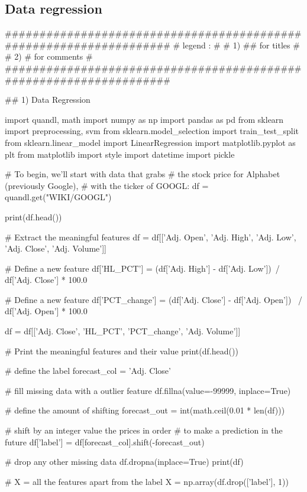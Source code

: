 \documentclass[11pt]{article}
\begin{document}
\subsection{Data regression}
\begin{python}
###################################################################
# legend :                                                        #
#         1) ## for titles                                        #
#         2) #  for comments                                      #
###################################################################

## 1) Data Regression

import quandl, math
import numpy as np
import pandas as pd
from sklearn import preprocessing, svm
from sklearn.model_selection import train_test_split
from sklearn.linear_model import LinearRegression
import matplotlib.pyplot as plt
from matplotlib import style
import datetime
import pickle

# To begin, we'll start with data that grabs
# the stock price for Alphabet (previously Google),
# with the ticker of GOOGL:
df = quandl.get("WIKI/GOOGL")

print(df.head())

# Extract the meaningful features
df = df[['Adj. Open',  'Adj. High',
         'Adj. Low',  'Adj. Close', 'Adj. Volume']]

# Define a new feature
df['HL_PCT'] = (df['Adj. High'] - df['Adj. Low'])\
               / df['Adj. Close'] * 100.0

# Define a new feature
df['PCT_change'] = (df['Adj. Close'] - df['Adj. Open']) \
                   / df['Adj. Open'] * 100.0

df = df[['Adj. Close', 'HL_PCT', 'PCT_change',
         'Adj. Volume']]

# Print the meaningful features and their value
print(df.head())

# define the label
forecast_col = 'Adj. Close'

# fill missing data with a outlier feature
df.fillna(value=-99999, inplace=True)

# define the amount of shifting
forecast_out = int(math.ceil(0.01 * len(df)))

# shift by an integer value the prices in order
# to make a prediction in the future
df['label'] = df[forecast_col].shift(-forecast_out)

# drop any other missing data
df.dropna(inplace=True)
print(df)

# X = all the features apart from the label
X = np.array(df.drop(['label'], 1))


\end{python}
\end{document}
